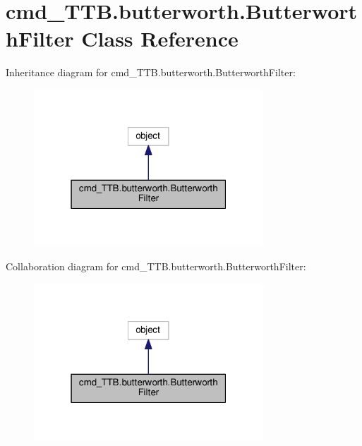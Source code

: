 \hypertarget{classcmd__TTB_1_1butterworth_1_1ButterworthFilter}{}\section{cmd\+\_\+\+T\+T\+B.\+butterworth.\+Butterworth\+Filter Class Reference}
\label{classcmd__TTB_1_1butterworth_1_1ButterworthFilter}


Inheritance diagram for cmd\+\_\+\+T\+T\+B.\+butterworth.\+Butterworth\+Filter\+:\nopagebreak
\begin{figure}[H]
\begin{center}
\leavevmode
\includegraphics[width=244pt]{classcmd__TTB_1_1butterworth_1_1ButterworthFilter__inherit__graph}
\end{center}
\end{figure}


Collaboration diagram for cmd\+\_\+\+T\+T\+B.\+butterworth.\+Butterworth\+Filter\+:\nopagebreak
\begin{figure}[H]
\begin{center}
\leavevmode
\includegraphics[width=244pt]{classcmd__TTB_1_1butterworth_1_1ButterworthFilter__coll__graph}
\end{center}
\end{figure}
